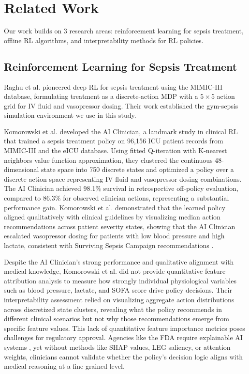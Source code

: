 
\section{Related Work}\label{sec:related}

Our work builds on 3 research areas: reinforcement learning for sepsis treatment, offline RL algorithms, and interpretability methods for RL policies.

\subsection{Reinforcement Learning for Sepsis Treatment}\label{sec:related:sepsis}

Raghu et al. \citeyearpar{raghu2017sepsis_drl} pioneered deep RL for sepsis treatment using the MIMIC-III database, formulating treatment as a discrete-action MDP with a $5 \times 5$ action grid for IV fluid and vasopressor dosing. Their work established the gym-sepsis simulation environment we use in this study.

Komorowski et al. \citeyearpar{komorowski2018ai_clinician} developed the AI Clinician, a landmark study in clinical RL that trained a sepsis treatment policy on 96,156 ICU patient records from MIMIC-III and the eICU database. Using fitted Q-iteration with K-nearest neighbors value function approximation, they clustered the continuous 48-dimensional state space into 750 discrete states and optimized a policy over a discrete action space representing IV fluid and vasopressor dosing combinations. The AI Clinician achieved 98.1\% survival in retrospective off-policy evaluation, compared to 86.3\% for observed clinician actions, representing a substantial performance gain. Komorowski et al. demonstrated that the learned policy aligned qualitatively with clinical guidelines by visualizing median action recommendations across patient severity states, showing that the AI Clinician escalated vasopressor dosing for patients with low blood pressure and high lactate, consistent with Surviving Sepsis Campaign recommendations \citep{rhodes2017ssc}.

Despite the AI Clinician's strong performance and qualitative alignment with medical knowledge, Komorowski et al. did not provide quantitative feature-attribution analysis to measure how strongly individual physiological variables such as blood pressure, lactate, and SOFA score drive policy decisions. Their interpretability assessment relied on visualizing aggregate action distributions across discretized state clusters, revealing what the policy recommends in different clinical scenarios but not why those recommendations emerge from specific feature values. This lack of quantitative feature importance metrics poses challenges for regulatory approval. Agencies like the FDA require explainable AI systems \citep{fda2021ai}, yet without methods like SHAP values, LEG saliency, or attention weights, clinicians cannot validate whether the policy's decision logic aligns with medical reasoning at a fine-grained level.

